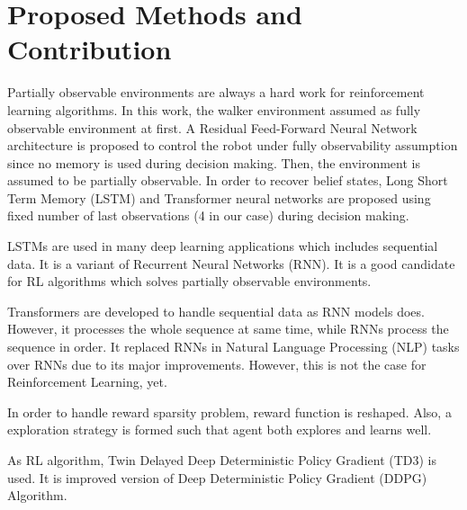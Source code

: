 \section{Proposed Methods and Contribution}
\label{sec:proposed_methods}

Partially observable environments are always a hard work for reinforcement learning algorithms. 
In this work, the walker environment assumed as fully observable environment at first. 
A Residual Feed-Forward Neural Network architecture is proposed to control 
the robot under fully observability assumption since no memory is used during decision making. 
Then, the environment is assumed to be partially observable. 
In order to recover belief states, Long Short Term Memory (LSTM) and 
Transformer neural networks are proposed using fixed number of 
last observations (4 in our case) during decision making. 

LSTMs are used in many deep learning applications which includes sequential data. 
It is a variant of Recurrent Neural Networks (RNN). 
It is a good candidate for RL algorithms which solves partially observable environments. 

Transformers are developed to handle sequential data as RNN models does. 
However, it processes the whole sequence at same time, while RNNs process the sequence in order. 
It replaced RNNs in Natural Language Processing (NLP) tasks over RNNs due to its major improvements. 
However, this is not the case for Reinforcement Learning, yet.

In order to handle reward sparsity problem, reward function is reshaped. Also, a exploration strategy is formed such that agent both explores and learns well. 

As RL algorithm, Twin Delayed Deep Deterministic Policy Gradient (TD3) is used. It is improved version of Deep Deterministic Policy Gradient (DDPG) Algorithm.
